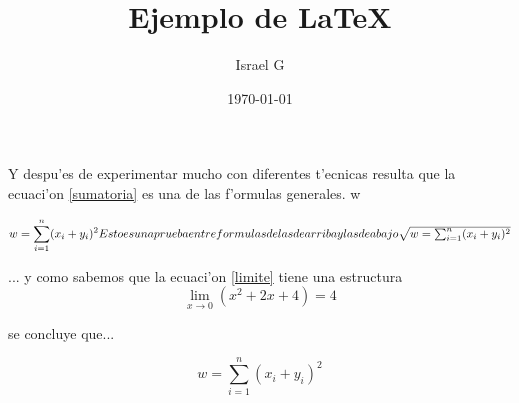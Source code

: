 \documentclass{article}
\title{Ejemplo de \LaTeX{}}
\author{Israel G}
\date{\today}
\begin{document}
\maketitle


Y despu'es de experimentar mucho con diferentes t'ecnicas resulta que la ecuaci'on \ref{sumatoria} es una de las f'ormulas generales. w

\begin{equation}
	\label{sumatoria}
	w = \sum_{i=1}^{n} (x_{i}+y_{i})^{2}$$Esto es una prueba entre formulas de las de arriba y las de abajo$$
	\sqrt{w = \sum_{i=1}^{n} (x_{i}+y_{i})^{2}}
\end{equation}

... y como sabemos que la ecuaci'on \ref{limite} tiene una estructura
\begin{equation*}
	\label{limite}
	\lim_{x \to 0} (x^{2} + 2x + 4) = 4
\end{equation*}

se concluye que...

\begin{equation}
	\label{sumatoria}
	w = \sum_{i=1}^{n} (x_{i}+y_{i})^{2}
\end{equation}
\end{document}
